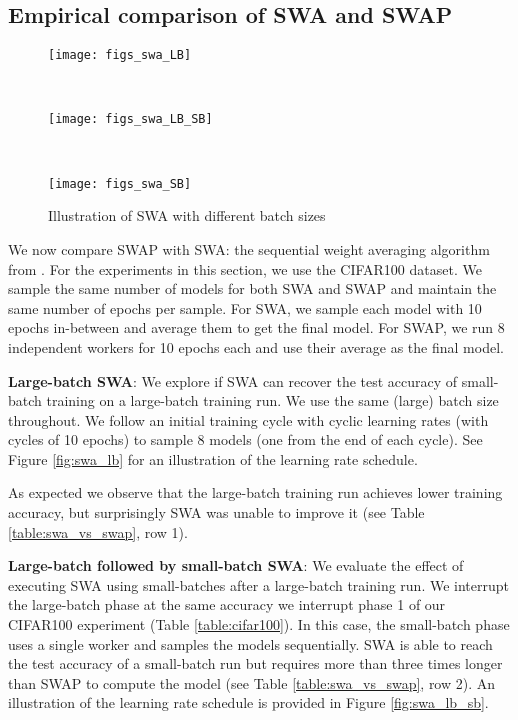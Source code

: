 \documentclass{article} %
\begin{document}
\subsection{Empirical comparison of SWA and SWAP}
\vspace{-0.05in}

\begin{figure}[t] 
\centering 
\begin{minipage}{0.32\textwidth} \centering
	\texttt{[image: figs\_swa\_LB]}  
\label{fig:swa_lb} \end{minipage} ~ 
\begin{minipage}{0.32\textwidth}
	\centering \vspace{3mm}
\texttt{[image: figs\_swa\_LB\_SB]} 
\label{fig:swa_lb_sb}
\end{minipage} 
~ \begin{minipage}{0.32\textwidth} \centering
	\texttt{[image: figs\_swa\_SB]}  \label{fig:swa_sb} \end{minipage} 
	\caption{\small Illustration of SWA
with different batch sizes} \label{fig:swa} 
\vspace{-0.2in}
\end{figure}{}

We now compare SWAP with SWA: the sequential weight averaging algorithm from
\cite{swa}. For the experiments in this section, we use the CIFAR100
dataset. We sample the same number of models for both SWA and SWAP and maintain
the same number of epochs per sample. For SWA, we sample each model with 10
epochs in-between and average them to get the final model. For SWAP, we run 8
independent workers for 10 epochs each and use their average as the final
model. 

\textbf{Large-batch SWA}: 
We explore if SWA can recover the test accuracy of small-batch training on a
large-batch training run. We use the same (large) batch size throughout. We
follow an initial training cycle with cyclic learning rates (with cycles of 10
epochs) to sample 8 models (one from the end of each cycle).  See
Figure \ref{fig:swa_lb} for an illustration of the learning rate schedule. 

As expected we observe that the large-batch training run achieves lower
training accuracy, but surprisingly SWA was unable to improve it 
(see Table \ref{table:swa_vs_swap}, row 1).

\textbf{Large-batch followed by small-batch SWA}: 
We evaluate the effect of executing SWA using small-batches after a large-batch
training run. We interrupt the large-batch phase at the same accuracy we
interrupt phase 1 of our CIFAR100 experiment (Table \ref{table:cifar100}). In this
case, the small-batch phase uses a single worker and samples the models
sequentially. SWA is able to reach the test accuracy of a small-batch run but
requires more than three times longer than SWAP to compute the model (see Table
\ref{table:swa_vs_swap}, row 2). An illustration of the learning rate schedule
is provided in Figure \ref{fig:swa_lb_sb}. 
\end{document}
